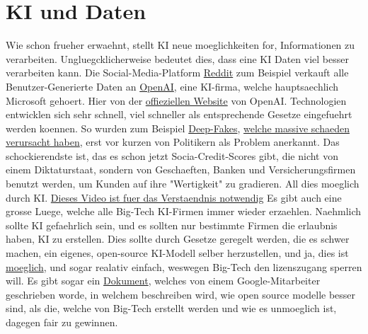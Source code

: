 \documentclass{report}
\begin{document}
\section{KI und Daten}
Wie schon frueher erwaehnt, stellt KI neue moeglichkeiten for, Informationen zu verarbeiten. Ungluegcklicherweise bedeutet dies, dass eine KI Daten viel besser verarbeiten kann.
Die Social-Media-Platform \hyperlink{reddit.com}{Reddit} zum Beispiel verkauft alle Benutzer-Generierte Daten an \hyperlink{https://openai.com/}{OpenAI}, eine KI-firma, welche hauptsaechlich Microsoft gehoert.
Hier von der \hyperlink{https://openai.com/index/openai-and-reddit-partnership/}{offieziellen Website} von OpenAI. 
\newline
\newline
Technologien entwicklen sich sehr schnell, viel schneller als entsprechende Gesetze eingefuehrt werden koennen. So wurden zum Beispiel \hyperlink{https://en.wikipedia.org/wiki/Deepfake}{Deep-Fakes}, \hyperlink{https://edition.cnn.com/2024/05/16/tech/arup-deepfake-scam-loss-hong-kong-intl-hnk/index.html}{welche massive schaeden verursacht haben}, erst vor kurzen von Politikern als Problem anerkannt.
\newline
\newline
Das schockierendste ist, das es schon jetzt Socia-Credit-Scores gibt, die nicht von einem Diktaturstaat, sondern von Geschaeften, Banken und Versicherungsfirmen benutzt werden, um Kunden auf ihre "Wertigkeit" zu gradieren. All dies moeglich durch KI.
\hyperlink{https://youtube.com/watch?v=VUhKTngpd8c}{Dieses Video ist fuer das Verstaendnis notwendig}
\newline
\newline
Es gibt auch eine grosse Luege, welche alle Big-Tech KI-Firmen immer wieder erzaehlen. Naehmlich sollte KI gefaehrlich sein, und es sollten nur bestimmte Firmen die erlaubnis haben, KI zu erstellen. Dies sollte durch Gesetze geregelt werden, die es schwer machen, ein eigenes, open-source KI-Modell selber herzustellen, und ja, dies ist \hyperlink{https://youtube.com/watch?v=188fipF-i5I}{moeglich}, und sogar realativ einfach, weswegen Big-Tech den lizenszugang sperren will.
\newline
Es gibt sogar ein \hyperlink{https://www.theguardian.com/technology/2023/may/05/google-engineer-open-source-technology-ai-openai-chatgpt}{Dokument}, welches von einem Google-Mitarbeiter geschrieben worde, in welchem beschreiben wird, wie open source modelle besser sind, als die, welche von Big-Tech erstellt werden und wie es unmoeglich ist, dagegen fair zu gewinnen.
\end{document}
